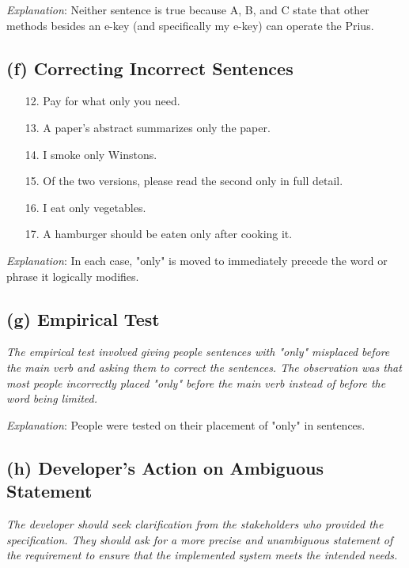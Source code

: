 \documentclass{article}
\begin{document}
\textit{Explanation}: Neither sentence is true because A, B, and C state that other methods besides an e-key (and specifically my e-key) can operate the Prius.

\subsection*{(f) Correcting Incorrect Sentences}

\begin{itemize}
    \item[12.] Pay for \checkmark what only you need.
    \item[13.] A paper's abstract summarizes \checkmark only the paper.
    \item[14.] I smoke \checkmark only Winstons.
    \item[15.] Of the two versions, please read the second \checkmark only in full detail.
    \item[16.] I eat \checkmark only vegetables.
    \item[17.] A hamburger should be eaten \checkmark only after cooking it.
\end{itemize}

\textit{Explanation}: In each case, "only" is moved to immediately precede the word or phrase it logically modifies.

\subsection*{(g) Empirical Test}

\textit{The empirical test involved giving people sentences with "only" misplaced before the main verb and asking them to correct the sentences. The observation was that most people incorrectly placed "only" before the main verb instead of before the word being limited.}

\textit{Explanation}: People were tested on their placement of "only" in sentences.

\subsection*{(h) Developer's Action on Ambiguous Statement}

\textit{The developer should seek clarification from the stakeholders who provided the specification. They should ask for a more precise and unambiguous statement of the requirement to ensure that the implemented system meets the intended needs.}
\end{document}
